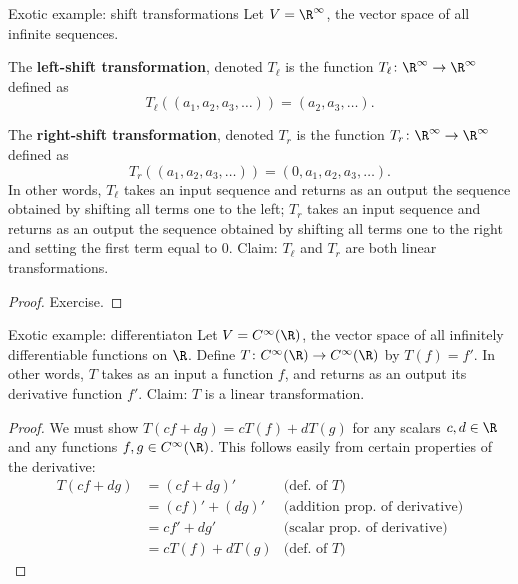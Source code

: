 \begin{frame}{Exotic example: \alert{shift transformations}}
 Let $V=\R^\infty$, the vector space of all infinite sequences. 
 
 The {\bf left-shift transformation}, denoted $T_\ell$ is the function $T_\ell\colon \R^\infty\rightarrow\R^\infty$ defined as 
 \[
 T_\ell\left( (a_1,a_2,a_3,\dots)\right)=(a_2,a_3,\dots).
 \]
 
 The {\bf right-shift transformation}, denoted $T_r$ is the function $T_r\colon \R^\infty\rightarrow\R^\infty$ defined as 
 \[
 T_r\left( (a_1,a_2,a_3,\dots)\right)=(0,a_1,a_2,a_3,\dots).
 \]
 \pause
 In other words, $T_\ell$ takes an input sequence and returns as an output the sequence obtained by shifting all terms one to the left; $T_r$ takes an input sequence and returns as an output the sequence obtained by shifting all terms one to the right and setting the first term equal to 0. 
 \bpause
 \alert{Claim}: $T_\ell$ and $T_r$ are both linear transformations.
 \begin{proof}
 Exercise.
 \end{proof}
\end{frame}
\begin{frame}{Exotic example: \alert{differentiaton}}
Let $V=C^\infty(\R)$, the vector space of all infinitely differentiable functions on $\R$. 
\bspace
Define $T\colon C^\infty(\R)\rightarrow C^\infty(\R)$ by $T(f)=f'$. 
\bspace
In other words, $T$ takes as an input a function $f$, and returns as an output its derivative function $f'$. 
\bpause
\alert{Claim}: $T$ is a linear transformation. 
\pause \begin{proof}
We must show $T(cf+dg)=cT(f)+dT(g)$ for any scalars $c,d\in\R$ and any functions $f, g\in C^\infty(\R)$. 
\bpause
This follows easily from certain properties of the derivative: 
\begin{align*}
T(cf+dg)&=(cf+dg)' &\text{(def. of $T$)}\\
&=(cf)'+(dg)'&\text{(addition prop. of derivative)}\\
&=cf'+dg' &\text{(scalar prop. of derivative)}\\
&=cT(f)+dT(g) &\text{(def. of $T$)}
\end{align*}
\end{proof}
\end{frame}
